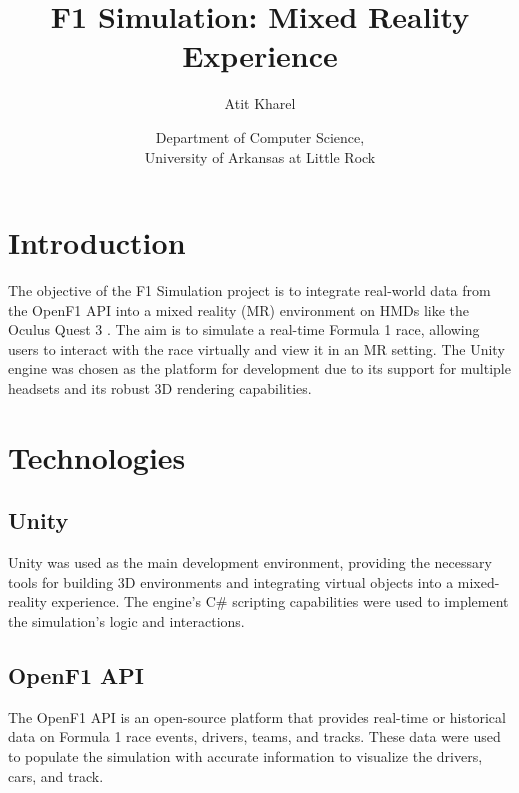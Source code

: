 \documentclass[
	a4paper, %
	10pt, %
	unnumberedsections, %
	twoside, %
]{LTJournalArticle}
\title{F1 Simulation: Mixed Reality Experience}
\author{Atit Kharel}
\date{\footnotesize Department of Computer Science, \\
University of Arkansas at Little Rock}
\begin{document}


\lstset{style=codestyle}

\maketitle

\section{Introduction}
The objective of the F1 Simulation project is to integrate real-world data from the OpenF1 API \autocite{godefroy_openf1} into a mixed reality (MR) environment on HMDs 
like the Oculus Quest 3 \autocite{oculus_quest_3}. The aim is to simulate a real-time Formula 1 race, allowing users to interact with the race virtually and view it in an 
MR setting. The Unity engine was chosen as the platform for development due to its support for multiple headsets and its robust 3D rendering capabilities.

\section{Technologies}
\subsection{Unity}
Unity was used as the main development environment, providing the necessary tools for building 3D environments and integrating virtual objects into a mixed-reality experience. 
The engine's C\# scripting capabilities were used to implement the simulation's logic and interactions.

\subsection{OpenF1 API}
The OpenF1 API is an open-source platform that provides real-time or historical data on Formula 1 race events, drivers, teams, and tracks. These data were used to populate the 
simulation with accurate information to visualize the drivers, cars, and track.
\end{document}
